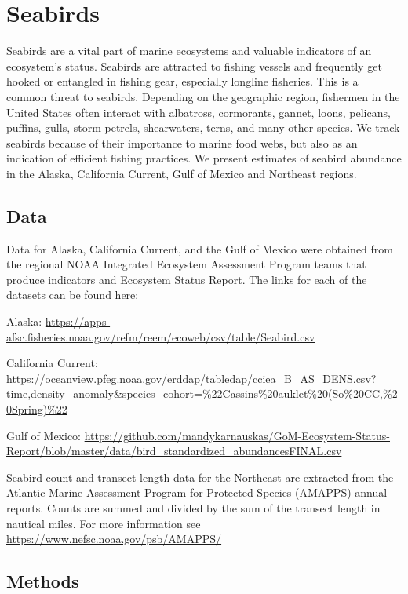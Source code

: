 \documentclass[
]{book}
\begin{document}
\hypertarget{seabirds}{%
\chapter{Seabirds}\label{seabirds}}

Seabirds are a vital part of marine ecosystems and valuable indicators of an ecosystem's status. Seabirds are attracted to fishing vessels and frequently get hooked or entangled in fishing gear, especially longline fisheries. This is a common threat to seabirds. Depending on the geographic region, fishermen in the United States often interact with albatross, cormorants, gannet, loons, pelicans, puffins, gulls, storm-petrels, shearwaters, terns, and many other species. We track seabirds because of their importance to marine food webs, but also as an indication of efficient fishing practices. We present estimates of seabird abundance in the Alaska, California Current, Gulf of Mexico and Northeast regions.

\hypertarget{data-3}{%
\section{Data}\label{data-3}}

Data for Alaska, California Current, and the Gulf of Mexico were obtained from the regional NOAA Integrated Ecosystem Assessment Program teams that produce indicators and Ecosystem Status Report. The links for each of the datasets can be found here:

Alaska: \url{https://apps-afsc.fisheries.noaa.gov/refm/reem/ecoweb/csv/table/Seabird.csv}

California Current: \url{https://oceanview.pfeg.noaa.gov/erddap/tabledap/cciea_B_AS_DENS.csv?time,density_anomaly\&species_cohort=\%22Cassins\%20auklet\%20(So\%20CC,\%20Spring)\%22}

Gulf of Mexico: \url{https://github.com/mandykarnauskas/GoM-Ecosystem-Status-Report/blob/master/data/bird_standardized_abundancesFINAL.csv}

Seabird count and transect length data for the Northeast are extracted from the Atlantic Marine Assessment Program for Protected Species (AMAPPS) annual reports. Counts are summed and divided by the sum of the transect length in nautical miles. For more information see \url{https://www.nefsc.noaa.gov/psb/AMAPPS/}

\hypertarget{methods-3}{%
\section{Methods}\label{methods-3}}
\end{document}
